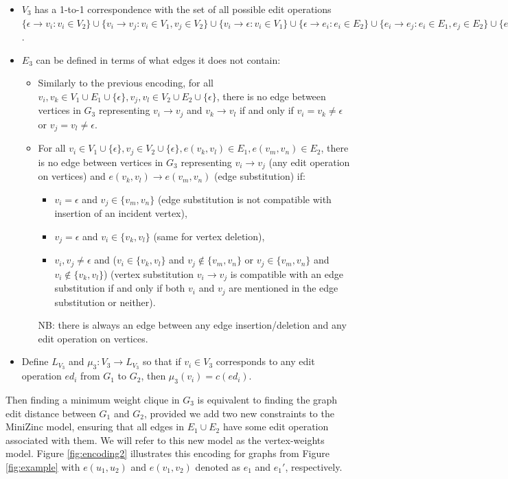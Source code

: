 \documentclass{article}
\theoremstyle{definition}
\begin{document}
\begin{itemize}
\item $V_3$ has a 1-to-1 correspondence with the set of all possible edit operations $\{ \epsilon \to v_i : v_i \in V_2 \} \cup \{ v_i \to v_j : v_i \in V_1, v_j \in V_2 \} \cup \{ v_i \to \epsilon : v_i \in V_1 \} \cup \{ \epsilon \to e_i : e_i \in E_2 \} \cup \{ e_i \to e_j : e_i \in E_1, e_j \in E_2 \} \cup \{ e_i \to \epsilon : e_i \in E_1 \}$.
\item  $E_3$ can be defined in terms of what edges it does not contain:
  \begin{itemize}
  \item Similarly to the previous encoding, for all $v_i, v_k \in V_1 \cup E_1 \cup \{ \epsilon \}, v_j, v_l \in V_2 \cup E_2 \cup \{ \epsilon \}$, there is no edge between vertices in $G_3$ representing $v_i \to v_j$ and $v_k \to v_l$ if and only if $v_i = v_k \ne \epsilon$ or $v_j = v_l \ne \epsilon$.
  \item For all $v_i \in V_1 \cup \{ \epsilon \}, v_j \in V_2 \cup \{ \epsilon \}, e(v_k, v_l) \in E_1, e(v_m, v_n) \in E_2$, there is no edge between vertices in $G_3$ representing $v_i \to v_j$ (any edit operation on vertices) and $e(v_k, v_l) \to e(v_m, v_n)$ (edge substitution) if:
    \begin{itemize}
    \item $v_i = \epsilon$ and $v_j \in \{ v_m, v_n \}$ (edge substitution is not compatible with insertion of an incident vertex),
    \item $v_j = \epsilon$ and $v_i \in \{ v_k, v_l \}$ (same for vertex deletion),
    \item $v_i, v_j \ne \epsilon$ and ($v_i \in \{ v_k, v_l \}$ and $v_j \not \in \{ v_m, v_n \}$ or $v_j \in \{ v_m, v_n \}$ and $v_i \not \in \{ v_k, v_l \}$) (vertex substitution $v_i \to v_j$ is compatible with an edge substitution if and only if both $v_i$ and $v_j$ are mentioned in the edge substitution or neither).
    \end{itemize}
    NB: there is always an edge between any edge insertion/deletion and any edit operation on vertices.
  \end{itemize}
\item Define $L_{V_3}$ and $\mu_3: V_3 \to L_{V_3}$ so that if $v_i \in V_3$ corresponds to any edit operation $ed_i$ from $G_1$ to $G_2$, then $\mu_3(v_i) = c(ed_i)$.
\end{itemize}
Then finding a minimum weight clique in $G_3$ is equivalent to finding the graph edit distance between $G_1$ and $G_2$, provided we add two new constraints to the MiniZinc model, ensuring that all edges in $E_1 \cup E_2$ have some edit operation associated with them. We will refer to this new model as the vertex-weights model. Figure \ref{fig:encoding2} illustrates this encoding for graphs from Figure \ref{fig:example} with $e(u_1, u_2)$ and $e(v_1, v_2)$ denoted as $e_1$ and $e_1'$, respectively.
\end{document}
